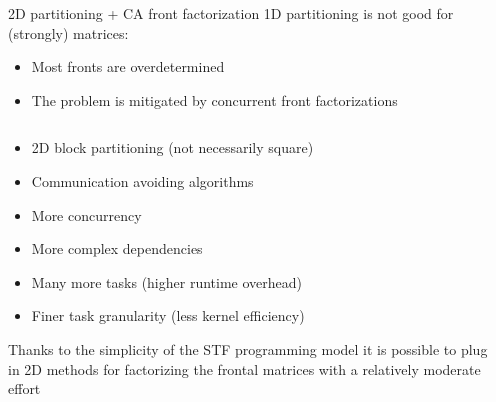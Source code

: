 \begin{frame}{2D partitioning + CA front factorization}
  1D partitioning is not good for (strongly)
   matrices:
  \begin{itemize}
  \item[\dr{$\blacktriangledown$}] Most fronts are overdetermined
  \item[\dg{$\blacktriangle$}] The problem is mitigated by
    concurrent front factorizations
  \end{itemize}


  \begin{columns}
    \begin{column}{0.8\textwidth}
      \begin{itemize}
      \item 2D block partitioning (not necessarily square)
      \item Communication avoiding algorithms
      \item[\dg{$\blacktriangle$}] More concurrency
      \item[\dr{$\blacktriangledown$}] More complex dependencies
      \item[\dr{$\blacktriangledown$}] Many more tasks (higher runtime overhead)
      \item[\dr{$\blacktriangledown$}] Finer task granularity (less kernel efficiency)
      \end{itemize}
      Thanks to the simplicity of the STF programming model it is
      possible to plug in \alert{2D methods} for factorizing the frontal
      matrices with a relatively moderate effort
    \end{column}
    \begin{column}{0.2\textwidth}
      \begin{center}

\end{center}
\end{column}
\end{columns}
\end{frame}
